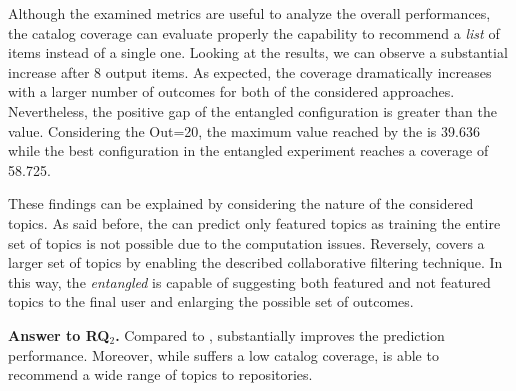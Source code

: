 Although the examined metrics are useful to analyze the overall performances, the catalog coverage can evaluate properly the capability to recommend a \emph{list} of items instead of a single one. Looking at the results, we can observe a substantial increase after 8 output items. As expected, the coverage dramatically increases with a larger number of outcomes for both of the considered approaches. Nevertheless, the positive gap of the entangled configuration is greater than the \MNB value. Considering the Out=20, the maximum value reached by the \MNB is 39.636 while the best configuration in the entangled experiment reaches a coverage of 58.725.

These findings can be explained by considering the nature of the considered topics. As said before, the \MNB can predict only featured topics as training the entire set of \GH topics is not possible due to the computation issues. Reversely, \TF covers a larger set of topics by enabling the described collaborative filtering technique. In this way, the \emph{entangled} is capable of suggesting both featured and not featured topics to the final user and enlarging the possible set of outcomes.



\begin{tcolorbox}[boxrule=0.86pt,left=0.3em, right=0.3em,top=0.1em, bottom=0.05em]
\textbf{Answer to RQ$_2$.} Compared to \MNB, \TFb substantially improves the prediction performance. Moreover, while \MNB suffers a low catalog coverage, \TFb is able to recommend a wide range of topics to repositories.
\end{tcolorbox}










